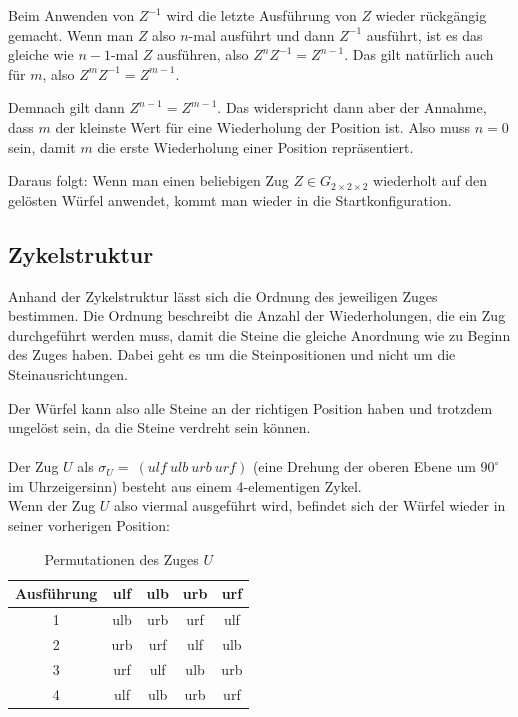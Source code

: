 \documentclass[12pt,a4paper, usenames, dvipsnames]{article}
\newcommand{\Gtwo}{\ensuremath{G_{2\times 2\times 2}}}
\begin{document}
Beim Anwenden von $Z^{-1}$ wird die letzte Ausführung von $Z$ wieder rückgängig gemacht. Wenn man $Z$ also $n$-mal ausführt und dann $Z^{-1}$ ausführt, ist es das gleiche wie $n-1$-mal $Z$ ausführen, also $Z^nZ^{-1}=Z^{n-1}$. Das gilt natürlich auch für $m$, also $Z^mZ^{-1}=Z^{m-1}$.


Demnach gilt dann $Z^{n-1}=Z^{m-1}$. Das widerspricht dann aber der Annahme, dass $m$ der kleinste Wert für eine Wiederholung der Position ist. Also muss $n=0$ sein, damit $m$ die erste Wiederholung einer Position repräsentiert. 


Daraus folgt: Wenn man einen beliebigen Zug $Z \in \Gtwo$ wiederholt auf den gelösten Würfel anwendet, kommt man wieder in die Startkonfiguration.
 
%
%
%
%
%
%
%
%
%
%
%
%
%
%
%
%
%
%
%
%


\subsection*{Zykelstruktur}


Anhand der Zykelstruktur lässt sich die Ordnung des jeweiligen Zuges bestimmen. Die Ordnung beschreibt die Anzahl der Wiederholungen, die ein Zug durchgeführt werden muss, damit die Steine die gleiche Anordnung wie zu Beginn des Zuges haben. Dabei geht es um die Steinpositionen und nicht um die Steinausrichtungen.

Der Würfel kann also alle Steine an der richtigen Position haben und trotzdem ungelöst sein, da die Steine verdreht sein können. \\
\\
Der Zug $U$ als $\sigma_U =\ (ulf \ ulb \ urb \ urf) $ (eine Drehung der oberen Ebene um $90^\circ$ im Uhrzeigersinn) besteht aus einem 4-elementigen Zykel. \\
Wenn der Zug $U$ also viermal ausgeführt wird, befindet sich der Würfel wieder in seiner vorherigen Position: 

\begin{table}[H]
\centering
\begin{tabular}{ccccc}
Ausführung & ulf & ulb & urb & urf \\
\hline
1 & ulb & urb & urf & ulf \\

2 & urb & urf & ulf & ulb \\

3 & urf & ulf & ulb & urb \\

4 & ulf & ulb & urb & urf \\


\end{tabular}
\caption[Permutationen des Zuges $U$]{Permutationen des Zuges $U$}
\end{table}
\end{document}
